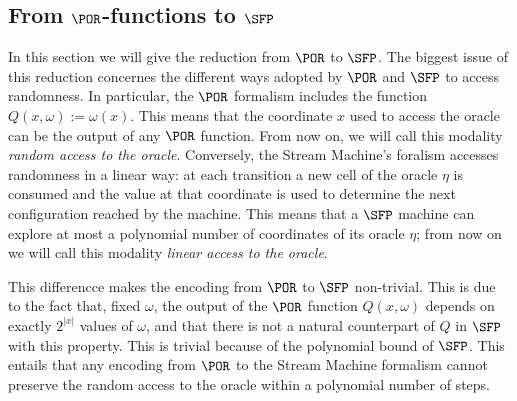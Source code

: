 



































\subsection{From $\POR$-functions
to $\SFP$}\label{sec:PORtoSFP}

In this section we will give the reduction from $\POR$ to $\SFP$.
The biggest issue of this reduction concernes the different ways adopted by
$\POR$ and $\SFP$ to access randomness.
In particular, the $\POR$ formalism includes the function
$Q(x, \omega) := \omega(x)$.
This means that the
coordinate $x$ used to access the oracle
can be the output of any $\POR$ function. From now on,
we will call this modality \emph{random access to the oracle}.
Conversely, the Stream Machine's foralism accesses randomness in a linear way:
at each transition a new cell of the oracle $\eta$ is consumed and the value
at that coordinate is used to determine the next configuration reached by the
machine.
This means that a $\SFP$ machine can explore at most a polynomial number
of coordinates of its oracle $\eta$; from now on we will call this modality
\emph{linear access to the oracle}.

This differencce makes the encoding from $\POR$ to $\SFP$
non-trivial. This is due to the fact that, fixed $\omega$, the output of the
$\POR$ function $Q(x, \omega)$ depends on
exactly $2^{|x|}$ values of $\omega$, and that
there is not a natural counterpart of $Q$ in $\SFP$ with this property.
This is trivial
because of the polynomial bound of $\SFP$. This entails that any
encoding from $\POR$ to the Stream Machine
formalism cannot preserve the random access to
the oracle within a polynomial number of steps.


